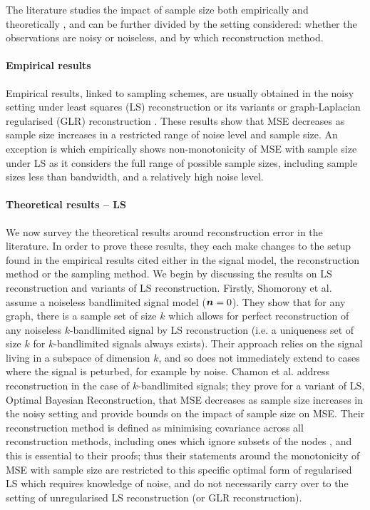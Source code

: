 The literature studies the impact of sample size both empirically and theoretically , and can be further divided by the setting considered: whether the observations are noisy or noiseless, and by which reconstruction method. 

\paragraph{Empirical results} Empirical results, linked to sampling schemes, are usually obtained in the noisy setting under least squares (LS) reconstruction or its variants \cite{ tremblay2017determinantal,wang2018optimal,wang2019low,chamon2017greedy} or graph-Laplacian regularised (GLR) reconstruction \cite{bai2020fast, tremblay2017determinantal}. These results show that MSE decreases as sample size increases in a restricted range of noise level and sample size. An exception is \cite[Fig. 1]{anis2016efficient} which empirically shows non-monotonicity of MSE with sample size under LS as it considers the {\color{black}full range of possible sample sizes, including sample sizes less than bandwidth,} and a relatively high noise level. 

\paragraph{Theoretical results -- LS} We now survey the theoretical results around reconstruction error in the literature. In order to prove these results, they each make changes to the setup found in the empirical results cited either in the signal model, the reconstruction method or the sampling method. We begin by discussing the results on LS reconstruction and variants of LS reconstruction. Firstly, Shomorony et al. \cite{shomorony2014sampling}  assume a noiseless bandlimited signal model ($\bm{n} = 0$). They show that for any graph, there is a sample set of size $k$ which allows for perfect reconstruction of any noiseless $k$-bandlimited signal by LS reconstruction (i.e. a uniqueness set of size $k$ for $k$-bandlimited signals always exists). Their approach relies on the signal living in a subspace of dimension $k$, and so does not immediately extend to cases where the signal is peturbed, for example by noise. Chamon et al. \cite{chamon2017greedy} address reconstruction in the case of $k$-bandlimited signals; they prove for a variant of LS, Optimal Bayesian Reconstruction, that MSE decreases as sample size increases in the noisy setting and provide bounds on the impact of sample size on MSE. Their reconstruction method is defined as minimising covariance across all reconstruction methods, including ones which ignore subsets of the nodes \cite[(7)]{chamon2017greedy}, and this is essential to their proofs; thus their statements around the monotonicity of MSE with sample size are restricted to this specific optimal form of regularised LS which requires knowledge of noise, and do not necessarily carry over to the setting of unregularised LS reconstruction (or GLR reconstruction). 

